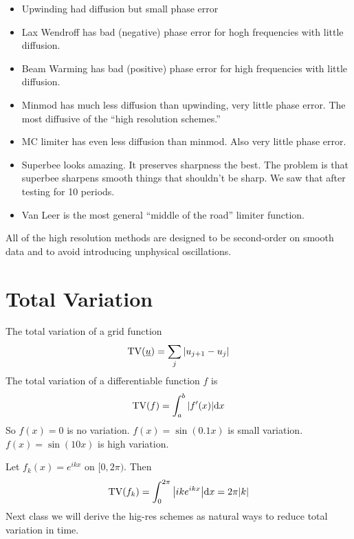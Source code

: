 \documentclass{article}
\begin{document}
        \begin{itemize}
            \item Upwinding had diffusion but small phase error
            \item Lax Wendroff has bad (negative) phase error for hogh frequencies with little diffusion.
            \item Beam Warming has bad (positive) phase error for high frequencies with little diffusion.
            \item Minmod has much less diffusion than upwinding, very little phase error.  The most diffusive of the ``high resolution schemes.''
            \item MC limiter has even less diffusion than minmod.  Also very little phase error.
            \item Superbee looks amazing.  It preserves sharpness the best.  The problem is that superbee sharpens smooth things that shouldn't be sharp.  We saw that after testing for 10 periods.
            \item Van Leer is the most general ``middle of the road'' limiter function.
        \end{itemize}
        All of the high resolution methods are designed to be second-order on smooth data and to avoid introducing unphysical oscillations. \\

    \section{Total Variation}

        The total variation of a grid function
        \begin{align*}
            \text{TV}(\underline{u}) = \sum_j\abs{u_{j+1} - u_j}
        \end{align*}
        The total variation of a differentiable function $f$ is
        \begin{align*}
            \text{TV}(f) = \int_a^b\abs{f'(x)}\dd x
        \end{align*}
        So $f(x) = 0$ is no variation.  $f(x) = \sin(0.1x)$ is small variation.  $f(x) = \sin(10x)$ is high variation.

        Let $f_k(x) = e^{ikx}$ on $[0,2\pi)$.  Then
        \begin{align*}
            \text{TV}(f_k) = \int_0^{2\pi}\abs{ike^{ikx}}\dd x = 2\pi\abs{k}
        \end{align*}
        Next class we will derive the hig-res schemes as natural ways to reduce total variation in time.
\end{document}

